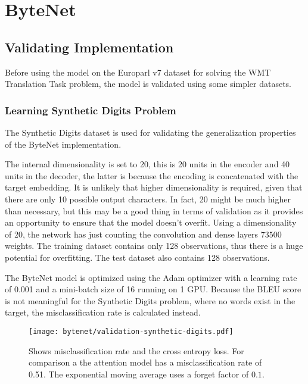 
\section{ByteNet}

\subsection{Validating Implementation}

Before using the model on the Europarl v7 dataset for solving the WMT Translation Task problem, the model is validated using some simpler datasets.

\subsubsection{Learning Synthetic Digits Problem}

The Synthetic Digits dataset is used for validating the generalization properties of the ByteNet implementation.

The internal dimensionality is set to 20, this is 20 units in the encoder and 40 units in the decoder, the latter is because the encoding is concatenated with the target embedding. It is unlikely that higher dimensionality is required, given that there are only 10 possible output characters. In fact, 20 might be much higher than necessary, but this may be a good thing in terms of validation as it provides an opportunity to ensure that the model doesn't overfit. Using a dimensionality of 20, the network has just counting the convolution and dense layers $73500$ weights. The training dataset contains only 128 observations, thus there is a huge potential for overfitting. The test dataset also contains 128 observations.

The ByteNet model is optimized using the Adam optimizer with a learning rate of 0.001 and a mini-batch size of 16 running on 1 GPU. Because the BLEU score is not meaningful for the Synthetic Digits problem, where no words exist in the target, the misclassification rate is calculated instead.

\begin{figure}[h]
    \centering
    \texttt{[image: bytenet/validation-synthetic-digits.pdf]}
    \caption{Shows misclassification rate and the cross entropy loss. For comparison a the attention model has a misclassification rate of 0.51. The exponential moving average uses a forget factor of $0.1$.}
    \label{fig:result:bytenet:digits}
\end{figure}

